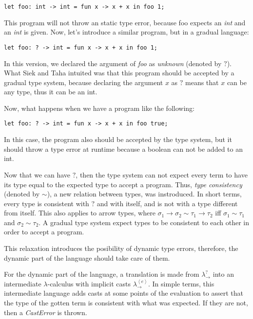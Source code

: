 \documentclass[submission]{eptcs}
\begin{document}
\begin{lstlisting}[language=Lambda]
let foo: int -> int = fun x -> x + x in foo 1;
\end{lstlisting}

This program will not throw an static type error, because foo expects an \textit{int} and an \textit{int} is given.
Now, let's introduce a similar program, but in a gradual language:

\begin{lstlisting}[language=Lambda]
let foo: ? -> int = fun x -> x + x in foo 1;
\end{lstlisting}

In this version, we declared the argument of \textit{foo} as \textit{unknown} (denoted by $?$).
What Siek and Taha \cite{Siek2006GradualTF} intuited was that this program should be accepted by a gradual type system, because declaring the argument $x$ as $?$ means that $x$ can be any type, thus it can be an int.

Now, what happens when we have a program like the following:

\begin{lstlisting}[language=Lambda]
let foo: ? -> int = fun x -> x + x in foo true;
\end{lstlisting}

In this case, the program also should be accepted by the type system, but it should throw a type error at runtime because a boolean can not be added to an int.

Now that we can have $?$, then the type system can not expect every term to have its type equal to the expected type to accept a program.
Thus, \textit{type consistency} (denoted by $\sim$), a new relation between types, was instroduced.
In short terms, every type is consistent with $?$ and with itself, and is not with a type different from itself.
This also applies to arrow types, where $\sigma_{1} \rightarrow \sigma_{2} \sim \tau_{1} \rightarrow \tau_{2}$ iff $\sigma_{1} \sim \tau_{1}$ and $\sigma_{2} \sim \tau_{2}$.
A gradual type system expect types to be consistent to each other in order to accept a program.

This relaxation introduces the posibility of dynamic type errors, therefore, the dynamic part of the language should take care of them.

For the dynamic part of the language, a translation is made from $\lambda^{?}_{\rightarrow}$ into an intermediate $\lambda$-calculus with implicit casts $\lambda^{\left\langle e \right\rangle}_{\rightarrow}$.
In simple terms, this intermediate language adds casts at some points of the evaluation to assert that the type of the gotten term is consistent with what was expected.
If they are not, then a \textit{CastError} is thrown.
\end{document}
